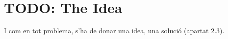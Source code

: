 
\section{TODO: The Idea}

I com en tot problema, s'ha de donar una idea, una solució (apartat 2.3).
